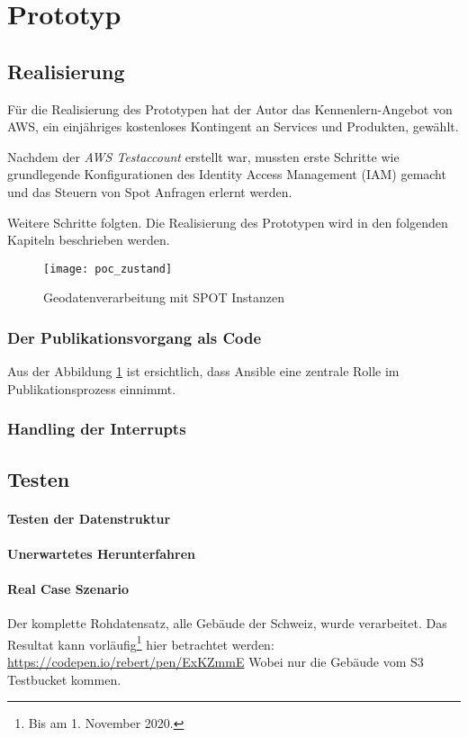 \section{Prototyp}
\subsection{Realisierung}
Für die Realisierung des Prototypen hat der Autor das Kennenlern-Angebot von AWS, ein einjähriges kostenloses Kontingent an Services und Produkten\cite{FreeTier2020}, gewählt. 

Nachdem der \emph{AWS Testaccount} erstellt war, mussten erste Schritte wie grundlegende Konfigurationen des Identity Access Management (IAM) gemacht und das Steuern von Spot Anfragen erlernt werden.

Weitere Schritte folgten. Die Realisierung des Prototypen wird in den folgenden Kapiteln beschrieben werden.

\begin{figure}[H]
	\centering
	\texttt{[image: poc\_zustand]}
	\caption{Geodatenverarbeitung mit SPOT Instanzen}
	\label{fig:ist_zustand}
\end{figure}

\subsubsection{Der Publikationsvorgang als Code}
Aus der Abbildung \ref{fig:ist_zustand} ist ersichtlich, dass Ansible eine zentrale Rolle im Publikationsprozess einnimmt. 

\subsubsection{Handling der Interrupts}



\subsection{Testen}

\paragraph{Testen der Datenstruktur}


\paragraph{Unerwartetes Herunterfahren}


\paragraph{Real Case Szenario}

Der komplette Rohdatensatz, alle Gebäude der Schweiz, wurde verarbeitet. Das Resultat kann vorläufig\footnote{Bis am 1. November 2020.} hier betrachtet werden:
\href{https://codepen.io/rebert/pen/ExKZmmE}{https://codepen.io/rebert/pen/ExKZmmE} Wobei nur die Gebäude vom S3 Testbucket kommen.
